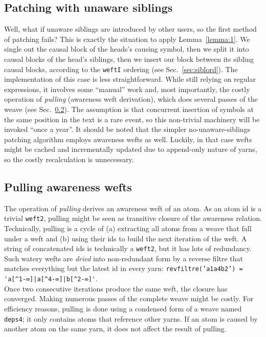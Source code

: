 \documentclass{sig-alternate}
\begin{document}
\subsection{Patching with unaware siblings} \label{sec:unre}

Well, what if unaware siblings are introduced by other users, so the first method of patching fails?
This is exactly the situation to apply Lemma~\ref{lemma:1}. 
We single out the causal block of the heads's causing symbol, then we split it into causal blocks of the head's siblings, then we insert our block between its sibling causal blocks, according to the {\tt weftI} ordering (see Sec.~\ref{sec:siblord}).
The implementation of this case is less straightforward.
While still relying on regular expressions, it involves some ``manual'' work and, most importantly, the costly operation of \emph{pulling} (awareness weft derivation), which does several passes of the weave (see Sec.~\ref{sec:pulling}).
The assumption is that concurrent insertion of symbols at the same position in the text is a rare event, so this non-trivial machinery will be invoked ``once a year''.
It should be noted that the simpler no-unaware-siblings patching algorithm employs awareness wefts as well.
Luckily, in that case wefts might be cached and incrementally updated due to append-only nature of yarns, so the costly recalculation is unnecessary.

\subsection{Pulling awareness wefts} \label{sec:pulling}

The operation of \emph{pulling} derives an awareness weft of an atom.
As an atom id is a trivial {\tt weft2}, pulling might be seen as transitive closure of the awareness relation.
Technically, pulling is a cycle of (a) extracting all atoms from a weave that fall under a weft and (b) using their ids to build the next iteration of the weft.
A string of concatenated ids is technically a {\tt weft2}, but it has lots of redundancy.
Such watery wefts are \emph{dried} into non-redundant form by a reverse filtre that matches everything but the latest id in every yarn:
{\tt revfiltre('a1a4b2') = \verb+'a[^1-∞]|a[^4-∞]|b[^2-∞]'+}.\\
Once two consecutive iterations produce the same weft, the closure has converged.
Making numerous passes of the complete weave might be costly.
For efficiency reasons, pulling is done using a condensed form of a weave named {\tt deps4}; it only contains atoms that reference other yarns.
If an atom is caused by another atom on the same yarn, it does not affect the result of pulling. 
\end{document}
